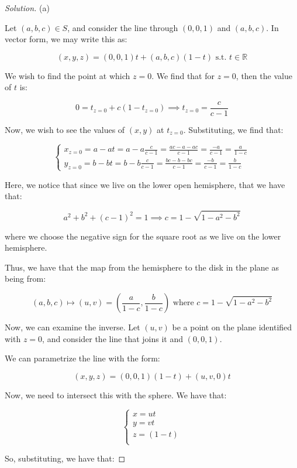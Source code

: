 \documentclass[10pt]{article}
\begin{document}
\begin{proof}[Solution]

(a)

Let $(a,b,c) \in S$, and consider the line through $(0,0,1)$ and $(a,b,c)$. In vector form, we may write this as:

$$ (x,y,z) = (0,0,1)t + (a,b,c) (1 - t)  \text{ s.t. } t \in \mathbb{R}$$

We wish to find the point at which $z = 0$. We find that for $z = 0$, then the value of $t$ is:

$$  0 = t_{z=0} + c(1 - t_{z=0}) \implies t_{z=0}  = \frac{c}{c - 1} $$

Now, we wish to see the values of $(x,y)$ at $t_{z=0}$. Substituting, we find that:

$$\begin{cases} x_{z=0} = a - at = a - a \frac{c}{c-1} = \frac{ac - a - ac}{c - 1} = \frac{-a}{ c- 1} = \frac{a}{1-c} \\ y_{z=0} = b - bt = b - b\frac{c}{c-1} = \frac{bc - b - bc}{c-1} = \frac{-b}{c-1} = \frac{b}{1-c}\end{cases} $$

Here, we notice that since we live on the lower open hemisphere, that we have that:

$$ a^2 + b^2 + (c-1)^2 = 1 \implies c = 1 - \sqrt{1 - a^2 - b^2} $$

where we choose the negative sign for the square root as we live on the lower hemisphere.

Thus, we have that the map from the hemisphere to the disk in the plane as being from:

$$ (a,b,c) \mapsto (u,v) = \left( \frac{a}{1-c}, \frac{b}{1-c} \right) \text{ where } c = 1 - \sqrt{1 - a^2 - b^2} $$

Now, we can examine the inverse. Let $(u,v)$ be a point on the plane identified with $z=0$, and consider the line that joins it and $(0,0,1)$.

We can parametrize the line with the form:

$$ (x,y,z) = (0,0,1)(1-t) + (u,v,0)t$$

Now, we need to intersect this with the sphere. We have that:

$$ \begin{cases} x = ut \\ y = vt \\ z = (1-t) \\ \end{cases}$$

So, substituting, we have that:


\end{proof}
\end{document}
